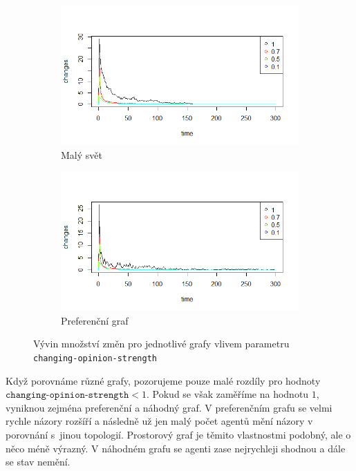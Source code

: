 \documentclass[10pt,a4paper]{report}
\begin{document}
\begin{figure}[h]
    \begin{subfigure}[b]{0.475\textwidth}  
      \centering 
      \includegraphics[width=\textwidth]{plots/spatial-g/ChangesOneSpatial.png}
      \caption[]%
      {{\small Malý svět}}    
      \label{fig:zmeny-maly svet}
  \end{subfigure}
  \quad
  \begin{subfigure}[b]{0.475\textwidth}   
      \centering 
      \includegraphics[width=\textwidth]{plots/prefferential-g/changesPrefferential.png}
      \caption[]%
      {{\small Preferenční graf}}    
      \label{fig:zmeny-preferencni}
  \end{subfigure}
  \caption[]
  {\small Vývin množství změn pro jednotlivé grafy vlivem parametru \texttt{changing-opinion-strength}}
  \label{fig:zmeny-grafy}
\end{figure}

Když porovnáme různé grafy, pozorujeme pouze malé rozdíly pro hodnoty $\texttt{changing-opinion-strength} < 1$. Pokud se však zaměříme na hodnotu $1$, vyniknou zejména preferenční a náhodný graf. V preferenčním grafu se velmi rychle názory rozšíří a následně už jen malý počet agentů mění názory v porovnání s~jinou topologií. Prostorový graf je těmito vlastnostmi podobný, ale o něco méně výrazný. V náhodném grafu se agenti zase nejrychleji shodnou a dále se stav nemění.
\end{document}
